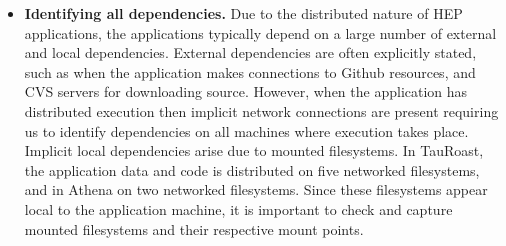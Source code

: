 \begin{itemize}

\item {\bf Identifying all dependencies.}  Due to the distributed nature of HEP applications, the applications typically depend on a large number of external and local dependencies.
External dependencies are often explicitly stated, such as when the application makes connections to Github resources, and CVS servers for downloading source. 
However, when the application has distributed execution then implicit network connections are present requiring us to identify dependencies on all machines where execution takes place. 
Implicit local dependencies arise due to mounted filesystems. In TauRoast, the application data and code is distributed on five networked filesystems, and in Athena on two networked filesystems. 
Since these filesystems appear local to the application machine, it is important to check and capture mounted filesystems and their respective mount points. 

%





\end{itemize}
